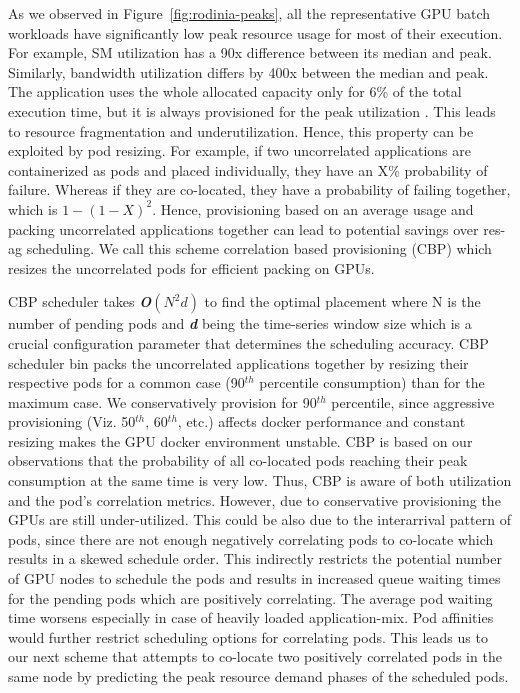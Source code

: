 
As we observed in Figure~\ref{fig:rodinia-peaks}, all the representative GPU batch workloads have significantly low peak resource usage for most of their execution. For example, SM utilization has a 90x difference between its median and peak. Similarly, bandwidth utilization differs by 400x between the median and peak. The application uses the whole allocated capacity only for 6\% of the total execution time, but it is always provisioned for the peak utilization . This leads to resource fragmentation and underutilization. Hence, this property can be exploited by pod resizing. For example, if two uncorrelated applications are containerized as pods and placed individually, they have an X\% probability of failure. Whereas if they are co-located, they have a probability of failing together, which is $1-( {1 - X})^2$. Hence, provisioning based on an average usage and packing uncorrelated applications together can lead to potential savings over res-ag scheduling. We call this scheme correlation based provisioning (CBP) which resizes the uncorrelated pods for efficient packing on GPUs.

CBP scheduler takes \textit{\textbf{O$(N^2d)$}} to find the optimal placement where N is the number of pending pods and \textit{\textbf{d}} being the time-series window size which is a crucial configuration parameter that determines the scheduling accuracy. CBP scheduler bin packs the uncorrelated applications together by resizing their respective pods for a common case (90$^{th}$ percentile consumption) than for the maximum case. We conservatively provision for 90$^{th}$ percentile, since aggressive provisioning (Viz. 50$^{th}$, 60$^{th}$, etc.) affects docker performance and constant resizing makes the GPU docker environment unstable. CBP is based on our observations that the probability of all co-located pods reaching their peak consumption at the same time is very low. Thus, CBP is aware of both utilization and the pod's correlation metrics. However, due to conservative provisioning the GPUs are still under-utilized. This could be also due to the interarrival pattern of pods, since there are not enough negatively correlating pods to co-locate which results in a skewed schedule order. This indirectly restricts the potential number of GPU nodes to schedule the pods and results in increased queue waiting times for the pending pods which are positively correlating. The average pod waiting time worsens especially in case of heavily loaded application-mix. Pod affinities would further restrict scheduling options for correlating pods. This leads us to our next scheme that attempts to co-locate two positively correlated pods in the same node by predicting the peak resource demand phases of the scheduled pods.


